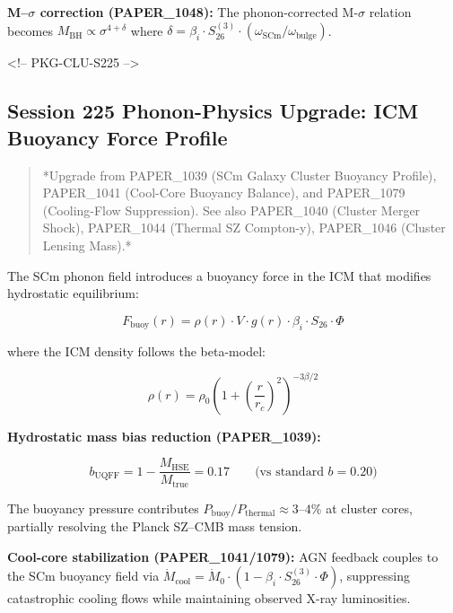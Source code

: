 \documentclass[12pt,a4paper]{article}
\begin{document}
\textbf{M--$\sigma$ correction (PAPER\_1048):} The phonon-corrected M-$\sigma$ relation becomes $M_{\text{BH}} \propto \sigma^{4+\delta}$ where $\delta = \beta_i \cdot S_{26}^{(3)} \cdot (\omega_{\text{SCm}}/\omega_{\text{bulge}})$.

<!-- PKG-CLU-S225 -->

\subsection{Session 225 Phonon-Physics Upgrade: ICM Buoyancy Force Profile}

\begin{quote}
*Upgrade from PAPER\_1039 (SCm Galaxy Cluster Buoyancy Profile),
PAPER\_1041 (Cool-Core Buoyancy Balance), and PAPER\_1079 (Cooling-Flow
Suppression).  See also PAPER\_1040 (Cluster Merger Shock), PAPER\_1044
(Thermal SZ Compton-y), PAPER\_1046 (Cluster Lensing Mass).*
\end{quote}

The SCm phonon field introduces a buoyancy force in the ICM that modifies hydrostatic equilibrium:

\begin{equation}
F_{\text{buoy}}(r) = \rho(r) \cdot V \cdot g(r) \cdot \beta_i \cdot S_{26} \cdot \Phi
\end{equation}

where the ICM density follows the beta-model:

\begin{equation}
\rho(r) = \rho_0 \left(1 + \left(\frac{r}{r_c}\right)^2\right)^{-3\beta/2}
\end{equation}

\textbf{Hydrostatic mass bias reduction (PAPER\_1039):}

\begin{equation}
b_{\text{UQFF}} = 1 - \frac{M_{\text{HSE}}}{M_{\text{true}}} = 0.17 \qquad \text{(vs standard } b = 0.20\text{)}
\end{equation}

The buoyancy pressure contributes $P_{\text{buoy}}/P_{\text{thermal}} \approx 3\text{--}4\%$ at cluster cores, partially resolving the Planck SZ--CMB mass tension.

\textbf{Cool-core stabilization (PAPER\_1041/1079):} AGN feedback couples to the SCm buoyancy field via $\dot{M}_{\text{cool}} = \dot{M}_0 \cdot (1 - \beta_i \cdot S_{26}^{(3)} \cdot \Phi)$, suppressing catastrophic cooling flows while maintaining observed X-ray luminosities.
\end{document}
